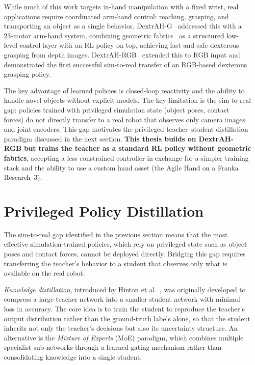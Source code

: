 While much of this work targets in-hand manipulation with a fixed wrist, real applications require coordinated arm-hand control: reaching, grasping, and transporting an object as a single behavior.
DextrAH-G~\cite{Lum2024} addressed this with a 23-motor arm-hand system, combining geometric fabrics~\cite{Ratliff2023} as a structured low-level control layer with an \ac{RL} policy on top, achieving fast and safe dexterous grasping from depth images.
DextrAH-RGB~\cite{Singh2025} extended this to RGB input and demonstrated the first successful sim-to-real transfer of an RGB-based dexterous grasping policy.

The key advantage of learned policies is closed-loop reactivity and the ability to handle novel objects without explicit models.
The key limitation is the sim-to-real gap: policies trained with privileged simulation state (object poses, contact forces) do not directly transfer to a real robot that observes only camera images and joint encoders.
This gap motivates the privileged teacher--student distillation paradigm discussed in the next section.
\textbf{This thesis builds on DextrAH-RGB but trains the teacher as a standard \ac{RL} policy without geometric fabrics}, accepting a less constrained controller in exchange for a simpler training stack and the ability to use a custom hand asset (the Agile Hand on a Franka Research~3).

\section{Privileged Policy Distillation}%
\label{sec:distillation}%

The sim-to-real gap identified in the previous section means that the most effective simulation-trained policies, which rely on privileged state such as object poses and contact forces, cannot be deployed directly.
Bridging this gap requires transferring the teacher's behavior to a student that observes only what is available on the real robot.

\emph{Knowledge distillation}, introduced by Hinton et al.~\cite{Hinton2015}, was originally developed to compress a large teacher network into a smaller student network with minimal loss in accuracy.
The core idea is to train the student to reproduce the teacher's output distribution rather than the ground-truth labels alone, so that the student inherits not only the teacher's decisions but also its uncertainty structure.
An alternative is the \emph{Mixture of Experts} (MoE) paradigm, which combines multiple specialist sub-networks through a learned gating mechanism rather than consolidating knowledge into a single student.

